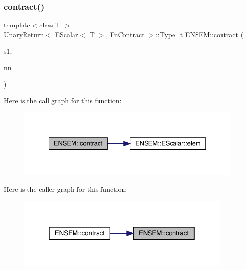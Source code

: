 \subsubsection{\texorpdfstring{contract()}{contract()}}
{\footnotesize\ttfamily template$<$class T $>$ \\
\mbox{\hyperlink{structENSEM_1_1UnaryReturn}{Unary\+Return}}$<$ \mbox{\hyperlink{classENSEM_1_1EScalar}{E\+Scalar}}$<$ T $>$, \mbox{\hyperlink{structENSEM_1_1FnContract}{Fn\+Contract}} $>$\+::Type\+\_\+t E\+N\+S\+E\+M\+::contract (\begin{DoxyParamCaption}\item[{const \mbox{\hyperlink{classENSEM_1_1EScalar}{E\+Scalar}}$<$ T $>$ \&}]{s1,  }\item[{const \mbox{\hyperlink{classXMLArray_1_1Array}{Array}}$<$ int $>$ \&}]{nn }\end{DoxyParamCaption})\hspace{0.3cm}{\ttfamily [inline]}}

Here is the call graph for this function\+:
\nopagebreak
\begin{figure}[H]
\begin{center}
\leavevmode
\includegraphics[width=328pt]{d4/dca/group__escalar_ga6c04652cc005e69e9785effa182a8436_cgraph}
\end{center}
\end{figure}
Here is the caller graph for this function\+:
\nopagebreak
\begin{figure}[H]
\begin{center}
\leavevmode
\includegraphics[width=301pt]{d4/dca/group__escalar_ga6c04652cc005e69e9785effa182a8436_icgraph}
\end{center}
\end{figure}
\mbox{\label{group__escalar_ga841db2f3f6d6a553733b1b75a638f052}} 
